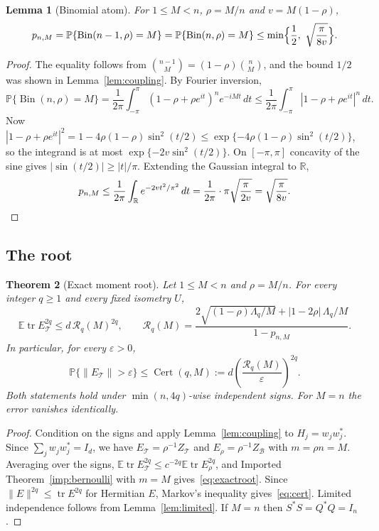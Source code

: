 \documentclass[11pt,a4paper]{article}
\newtheorem{theorem}{Theorem}[section]
\newtheorem{lemma}[theorem]{Lemma}
\theoremstyle{definition}
\theoremstyle{remark}
\numberwithin{equation}{section}
\newcommand{\E}{\mathbb E}
\newcommand{\Prob}{\mathbb P}
\newcommand{\R}{\mathbb R}
\newcommand{\tr}{\operatorname{tr}}
\newcommand{\Bin}{\operatorname{Bin}}
\newcommand{\eps}{\varepsilon}
\newcommand{\norm}[1]{\lVert#1\rVert}
\newcommand{\cT}{\mathcal T}
\newcommand{\Cert}{\operatorname{Cert}}
\newcommand{\Rex}{\mathcal R}
\begin{document}
\begin{lemma}[Binomial atom]\label{lem:atom}
For $1\le M<n$, $\rho=M/n$ and $v=M(1-\rho)$,
\[
 p_{n,M}=\Prob\{\Bin(n-1,\rho)=M\}=\Prob\{\Bin(n,\rho)=M\}
 \le\min\Bigl\{\frac12,\ \sqrt{\frac{\pi}{8v}}\Bigr\}.
\]
\end{lemma}
\begin{proof}
The equality follows from $\binom{n-1}M=(1-\rho)\binom nM$, and the bound
$1/2$ was shown in Lemma~\ref{lem:coupling}. By Fourier inversion,
\[
 \Prob\{\Bin(n,\rho)=M\}
 =\frac1{2\pi}\int_{-\pi}^{\pi}(1-\rho+\rho e^{it})^ne^{-iMt}\,dt
 \le\frac1{2\pi}\int_{-\pi}^{\pi}|1-\rho+\rho e^{it}|^n\,dt .
\]
Now $|1-\rho+\rho e^{it}|^2=1-4\rho(1-\rho)\sin^2(t/2)\le
\exp\{-4\rho(1-\rho)\sin^2(t/2)\}$, so the integrand is at most
$\exp\{-2v\sin^2(t/2)\}$. On $[-\pi,\pi]$ concavity of the sine gives
$|\sin(t/2)|\ge|t|/\pi$. Extending the Gaussian integral to $\R$,
\[
 p_{n,M}\le\frac1{2\pi}\int_\R e^{-2vt^2/\pi^2}\,dt
 =\frac1{2\pi}\cdot\pi\sqrt{\frac{\pi}{2v}}=\sqrt{\frac\pi{8v}} .\qedhere
\]
\end{proof}

\subsection{The root}
\begin{theorem}[Exact moment root]\label{thm:exactroot}
Let $1\le M<n$ and $\rho=M/n$. For every integer $q\ge1$ and every fixed
isometry $U$,
\begin{equation}\label{eq:exactroot}
 \E\tr E_\cT^{2q}\le d\,\Rex_q(M)^{2q},\qquad
 \Rex_q(M)=\frac{2\sqrt{(1-\rho)\Lambda_q/M}+|1-2\rho|\,\Lambda_q/M}{1-p_{n,M}} .
\end{equation}
In particular, for every $\eps>0$,
\begin{equation}\label{eq:cert}
 \Prob\{\norm{E_\cT}>\eps\}\le\Cert(q,M):=d\left(\frac{\Rex_q(M)}{\eps}\right)^{2q}.
\end{equation}
Both statements hold under $\min(n,4q)$-wise independent signs. For $M=n$ the
error vanishes identically.
\end{theorem}
\begin{proof}
Condition on the signs and apply Lemma~\ref{lem:coupling} to $H_j=w_jw_j^*$.
Since $\sum_jw_jw_j^*=I_d$, we have $E_\cT=\rho^{-1}Z_\cT$ and
$E_\rho=\rho^{-1}Z_{\mathcal B}$ with $m=\rho n=M$. Averaging over the signs,
$\E\tr E_\cT^{2q}\le c^{-2q}\E\tr E_\rho^{2q}$, and
Imported Theorem~\ref{imp:bernoulli} with $m=M$ gives~\eqref{eq:exactroot}.
Since $\norm{E}^{2q}\le\tr E^{2q}$ for Hermitian $E$, Markov's inequality
gives~\eqref{eq:cert}. Limited independence follows from
Lemma~\ref{lem:limited}. If $M=n$ then $S^*S=Q^*Q=I_n$.
\end{proof}
\end{document}
